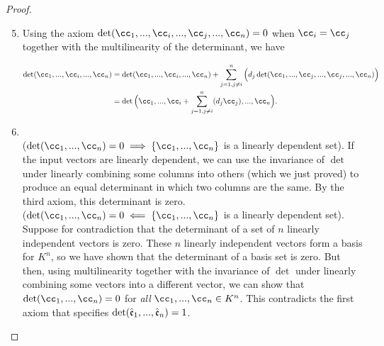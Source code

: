 \begin{proof}
    \mbox{} \\
    \begin{enumerate}
    \setcounter{enumi}{4}
        \item 
        
        Using the axiom $\det(\cc_1, ..., \cc_i, ..., \cc_j, ..., \cc_n) = 0$ when $\cc_i = \cc_j$ together with the multilinearity of the determinant, we have
        
        \begin{align*}
            \det(\cc_1, ..., \cc_i, ..., \cc_n)
            &= \det(\cc_1, ..., \cc_i, ..., \cc_n) + \sum_{j = 1, j \neq i}^n \Big( d_j \det(\cc_1, ..., \cc_j, ..., \cc_j, ..., \cc_n) \Big) \\
            &= \det\Big( \cc_1, ..., \cc_i + \sum_{j = 1, j \neq i}^n (d_j \cc_j), ..., \cc_n \Big).
        \end{align*}
        
        \item 
        \mbox{}
        \\ \indent ($\det(\cc_1, ..., \cc_n) = 0 \implies \{\cc_1, ..., \cc_n\}$ is a linearly dependent set). If the input vectors are linearly dependent, we can use the invariance of $\det$ under linearly combining some columns into others (which we just proved) to produce an equal determinant in which two columns are the same. By the third axiom, this determinant is zero.
        \\ \indent ($\det(\cc_1, ..., \cc_n) = 0 \impliedby \{\cc_1, ..., \cc_n\}$ is a linearly dependent set). Suppose for contradiction that the determinant of a set of $n$ linearly independent vectors is zero. These $n$ linearly independent vectors form a basis for $K^n$, so we have shown that the determinant of a basis set is zero. But then, using multilinearity together with the invariance of $\det$ under linearly combining some vectors into a different vector, we can show that $\det(\cc_1, ..., \cc_n) = 0$ for \textit{all} $\cc_1, ..., \cc_n \in K^n$. This contradicts the first axiom that specifies $\det(\hat{\mathfrak{e}}_1, ..., \hat{\mathfrak{e}}_n) = 1$.
    \end{enumerate}
\end{proof}

